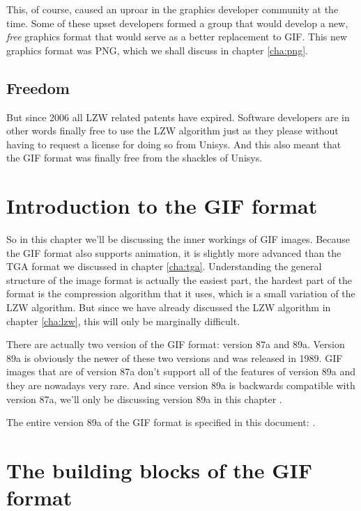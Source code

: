   This, of course, caused an uproar in the graphics developer
  community at the time. Some of these upset developers formed a group
  that would develop a new, \textit{free} graphics format that would
  serve as a better replacement to GIF. This new graphics format was
  PNG, which we shall discuss in chapter \ref{cha:png}.

  \subsection{Freedom}

  But since 2006 all LZW related patents have expired. Software
  developers are in other words finally free to use the LZW algorithm
  just as they please without having to request a license for doing so
  from Unisys. And this also meant that the GIF format was finally
  free from the shackles of Unisys.

  \section{Introduction to the GIF format}

  So in this chapter we'll be discussing the inner workings of GIF
  images. Because the GIF format also supports animation, it is
  slightly more advanced than the TGA format we discussed in chapter
  \ref{cha:tga}. Understanding the general structure of the image
  format is actually the easiest part, the hardest part of the format
  is the compression algorithm that it uses, which is a small
  variation of the LZW algorithm. But since we have already discussed
  the LZW algorithm in chapter \ref{cha:lzw}, this will only be
  marginally difficult.

  There are actually two version of the GIF format: version 87a and
  89a. Version 89a is obviously the newer of these two versions and
  was released in 1989. GIF images that are of version 87a don't
  support all of the features of version 89a and they are nowadays
  very rare. And since version 89a is backwards compatible with
  version 87a, we'll only be discussing version 89a in this chapter
  \cite{gif89a,gif87a}.

  The entire version 89a of the GIF format is specified in this
  document: \cite{gif89a}.

  \section{The building blocks of the GIF format}

